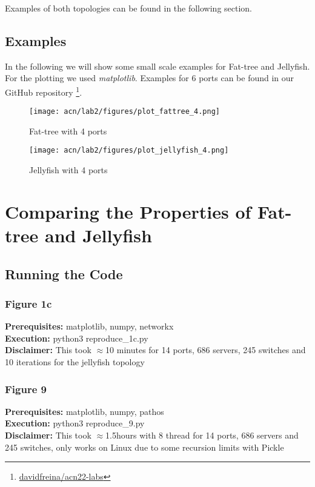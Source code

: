 \documentclass[a4paper,11pt]{article}
\begin{document}
Examples of both topologies can be found in the following section.

\subsection{Examples}
In the following we will show some small scale examples for Fat-tree and Jellyfish.
For the plotting we used \textit{matplotlib}.
Examples for 6 ports can be found in our GitHub repository \footnote{\href{https://github.com/davidfreina/acn22-labs}{davidfreina/acn22-labs}}.

\begin{figure}[ht]
    \centering
    \texttt{[image: acn/lab2/figures/plot\_fattree\_4.png]}
    \caption{Fat-tree with 4 ports}
    \label{fig:fattree4}
\end{figure}

\begin{figure}[ht]
    \centering
    \texttt{[image: acn/lab2/figures/plot\_jellyfish\_4.png]}
    \caption{Jellyfish with 4 ports}
    \label{fig:jelly6}
\end{figure}

\newpage


\section{Comparing the Properties of Fat-tree and Jellyfish}



\subsection{Running the Code}

\subsubsection{Figure 1c}
\textbf{Prerequisites:} matplotlib, numpy, networkx\\
\textbf{Execution:} python3 reproduce\_1c.py\\
\textbf{Disclaimer:} This took $\approx$10 minutes for 14 ports, 686 servers, 245 switches and 10 iterations for the jellyfish topology

\subsubsection{Figure 9}
\textbf{Prerequisites:} matplotlib, numpy, pathos\\
\textbf{Execution:} python3 reproduce\_9.py\\
\textbf{Disclaimer:} This took $\approx$1.5hours with 8 thread for 14 ports, 686 servers and 245 switches, only works on Linux due to some recursion limits with Pickle
\end{document}
